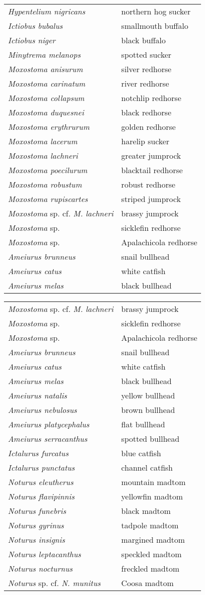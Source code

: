 \documentclass[11pt]{article}
\begin{document}
\begin{tabular}{@{}L{3in}L{3in}@{}}
\textit{Hypentelium nigricans} &   northern hog sucker\tabularnewline
\textit{Ictiobus bubalus} &   smallmouth buffalo\tabularnewline
\textit{Ictiobus niger} &   black buffalo\tabularnewline
\textit{Minytrema melanops} &   spotted sucker\tabularnewline
\textit{Moxostoma anisurum} &   silver redhorse\tabularnewline
\textit{Moxostoma carinatum} &   river redhorse\tabularnewline
\textit{Moxostoma collapsum} &   notchlip redhorse\tabularnewline
\textit{Moxostoma duquesnei} &   black redhorse\tabularnewline
\textit{Moxostoma erythrurum} &   golden redhorse\tabularnewline
\textit{Moxostoma lacerum} &   harelip sucker\tabularnewline
\textit{Moxostoma lachneri} &   greater jumprock\tabularnewline
\textit{Moxostoma poecilurum} &   blacktail redhorse\tabularnewline
\textit{Moxostoma robustum} &   robust redhorse\tabularnewline
\textit{Moxostoma rupiscartes} &   striped jumprock\tabularnewline
\textit{Moxostoma} sp. cf. \textit{M. lachneri} &   brassy jumprock\tabularnewline
\textit{Moxostoma} sp. &   sicklefin redhorse\tabularnewline
\textit{Moxostoma} sp. &   Apalachicola redhorse\tabularnewline
\textit{Ameiurus brunneus} &   snail bullhead\tabularnewline
\textit{Ameiurus catus} &   white catfish\tabularnewline
\textit{Ameiurus melas} &   black bullhead\tabularnewline
\end{tabular}

\newpage

\vspace{\baselineskip}

%
\textbf{\Student}

\begin{tabular}{@{}L{3in}L{3in}@{}}
\textit{Moxostoma} sp. cf. \textit{M. lachneri} &   brassy jumprock\tabularnewline
\textit{Moxostoma} sp. &   sicklefin redhorse\tabularnewline
\textit{Moxostoma} sp. &   Apalachicola redhorse\tabularnewline
\textit{Ameiurus brunneus} &   snail bullhead\tabularnewline
\textit{Ameiurus catus} &   white catfish\tabularnewline
\textit{Ameiurus melas} &   black bullhead\tabularnewline
\textit{Ameiurus natalis} &   yellow bullhead\tabularnewline
\textit{Ameiurus nebulosus} &   brown bullhead\tabularnewline
\textit{Ameiurus platycephalus} &   flat bullhead\tabularnewline
\textit{Ameiurus serracanthus} &   spotted bullhead\tabularnewline
\textit{Ictalurus furcatus} &   blue catfish\tabularnewline
\textit{Ictalurus punctatus} &   channel catfish\tabularnewline
\textit{Noturus eleutherus} &   mountain madtom\tabularnewline
\textit{Noturus flavipinnis} &   yellowfin madtom\tabularnewline
\textit{Noturus funebris} &   black madtom\tabularnewline
\textit{Noturus gyrinus} &   tadpole madtom\tabularnewline
\textit{Noturus insignis} &   margined madtom\tabularnewline
\textit{Noturus leptacanthus} &   speckled madtom\tabularnewline
\textit{Noturus nocturnus} &   freckled madtom\tabularnewline
\textit{Noturus} sp. cf. \textit{N. munitus} &   Coosa madtom\tabularnewline
\end{tabular}
\end{document}
